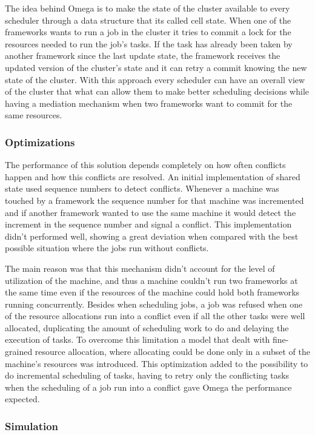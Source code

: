 \documentclass{svjour3}                     %
\begin{document}
The idea behind Omega is to make the state of the cluster
available to every scheduler through a data structure that its called
cell state. When one of the frameworks wants to run a job in the
cluster it tries to commit a lock for the resources needed to run the
job's tasks. If the task has already been taken by another framework
since the last update state, the framework receives the updated
version of the cluster's state and it can retry a commit knowing the
new state of the cluster. With this approach every scheduler can have
an overall view of the cluster that what can allow them to make better
scheduling decisions while having a mediation mechanism when two
frameworks want to commit for the same resources.

\subsubsection{Optimizations}

The performance of this solution depends completely on how often
conflicts happen and how this conflicts are resolved. An initial
implementation of shared state used sequence numbers to detect
conflicts. Whenever a machine was touched by a framework the sequence
number for that machine was incremented and if another framework
wanted to use the same machine it would detect the increment in the
sequence number and signal a conflict. This implementation didn't
performed well, showing a great deviation when compared with the best
possible situation where the jobs run without conflicts.

The main reason was that this mechanism didn't account for the level
of utilization of the machine, and thus a machine couldn't run two
frameworks at the same time even if the resources of the machine could
hold both frameworks running concurrently. Besides when scheduling
jobs, a job was refused when one of the resource allocations run into
a conflict even if all the other tasks were well allocated,
duplicating the amount of scheduling work to do and delaying the
execution of tasks. To overcome this limitation a model that dealt
with fine-grained resource allocation, where allocating could be done
only in a subset of the machine's resources was introduced. This
optimization added to the possibility to do incremental scheduling of
tasks, having to retry only the conflicting tasks when the scheduling
of a job run into a conflict gave Omega the performance expected.

\subsubsection{Simulation}
\end{document}
